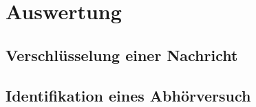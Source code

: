 \section{Auswertung}

\subsection{Verschlüsselung einer Nachricht}

\subsection{Identifikation eines Abhörversuch}
